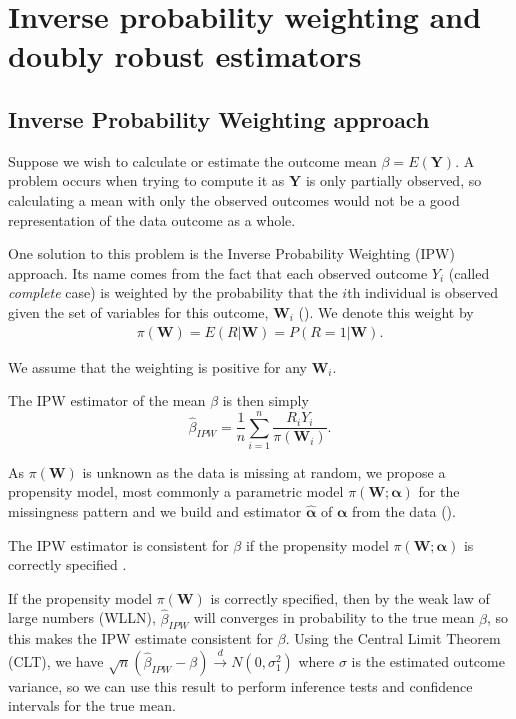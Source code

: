\documentclass[12pt,twoside]{article}
\begin{document}
\section{Inverse probability weighting and doubly robust estimators}

\subsection{Inverse Probability Weighting approach}

Suppose we wish to calculate or estimate the outcome mean $\beta = E(\mathbf{Y})$. A problem occurs when trying to compute it as $\mathbf{Y}$ is only partially observed, so calculating a mean with only the observed outcomes would not be a good representation of the data outcome as a whole.

One solution to this problem is the Inverse Probability Weighting (IPW) approach. Its name comes from the fact that each observed outcome $Y_i$ (called \textit{complete} case) is weighted by the probability that the $i$th individual is observed given the set of variables for this outcome, $\mathbf{W}_i$ (\citeauthor{vansteelandt}). We denote this weight by
\begin{align*}
    \pi(\mathbf{W})= E(R|\mathbf{W}) = P(R = 1|\mathbf{W}).
\end{align*}

We assume that the weighting is positive for any $\mathbf{W}_i$.

The IPW estimator of the mean $\beta$ is then simply 
\begin{equation} \label{IPW_est}
    \hat{\beta}_{IPW} = \frac{1}{n} \sum_{i=1}^{n} \frac{R_iY_i}{\pi(\mathbf{W}_i)}.
\end{equation}

As $\pi(\mathbf{W})$ is unknown as the data is missing at random, we propose a propensity model, most commonly a parametric model $\pi(\mathbf{W}; \boldsymbol\alpha)$ for the missingness pattern and we build and estimator $\hat{\boldsymbol\alpha}$ of $\boldsymbol\alpha$ from the data (\citeauthor{vansteelandt}).

The IPW estimator is consistent for $\beta$ if the propensity model $\pi(\mathbf{W}; \boldsymbol\alpha)$ is correctly specified \citep{davidian}. 

If the propensity model $\pi(\mathbf{W})$ is correctly specified, then by the weak law of large numbers (WLLN), $\hat{\beta}_{IPW}$ will converges in probability to the true mean $\beta$, so this makes the IPW estimate consistent for $\beta$. Using the Central Limit Theorem (CLT), we have $\sqrt{n}(\hat{\beta}_{IPW}-\beta) \xrightarrow{d} N(0,\sigma_1^2)$ where $\sigma$ is the estimated outcome variance, so we can use this result to perform inference tests and confidence intervals for the true mean.
\end{document}
